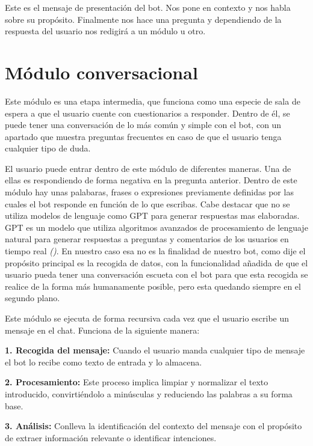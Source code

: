 Este es el mensaje de presentación del bot. Nos pone en contexto y nos habla sobre su propósito. Finalmente nos hace una pregunta y dependiendo de la respuesta del usuario nos redigirá a un módulo u otro. 

\section{Módulo conversacional}

Este módulo es una etapa intermedia, que funciona como una especie de sala de espera a que el usuario cuente con cuestionarios a responder. Dentro de él, se puede tener una conversación de lo más común y simple con el bot, con un apartado que muestra preguntas frecuentes en caso de que el usuario tenga cualquier tipo de duda. 

El usuario puede entrar dentro de este módulo de diferentes maneras. Una de ellas es respondiendo de forma negativa en la pregunta anterior. Dentro de este módulo hay unas palabaras, frases o expresiones previamente definidas por las cuales el bot responde en función de lo que escribas. Cabe destacar que no se utiliza modelos de lenguaje como GPT para generar respuestas mas elaboradas. GPT es un modelo que utiliza algoritmos avanzados de procesamiento de lenguaje natural para generar respuestas a preguntas y comentarios de los usuarios en tiempo real \textit{(\cite{gpt2020})}. En nuestro caso esa no es la finalidad de nuestro bot, como dije el propósito principal es la recogida de datos, con la funcionalidad añadida de que el usuario pueda tener una conversación escueta con el bot para que esta recogida se realice de la forma más humanamente posible, pero esta quedando siempre en el segundo plano. 

Este módulo se ejecuta de forma recursiva cada vez que el usuario escribe un mensaje en el chat. Funciona de la siguiente manera:\vspace{0.3cm}

\textbf{1. Recogida del mensaje: }Cuando el usuario manda cualquier tipo de mensaje el bot lo recibe como texto de entrada y lo almacena.\vspace{0.3cm}

\textbf{2. Procesamiento: }Este proceso implica limpiar y normalizar el texto introducido, convirtiéndolo a minúsculas y reduciendo las palabras a su forma base. \vspace{0.3cm}

\textbf{3. Análisis: }Conlleva la identificación del contexto del mensaje con el propósito de extraer información relevante o identificar intenciones. 


